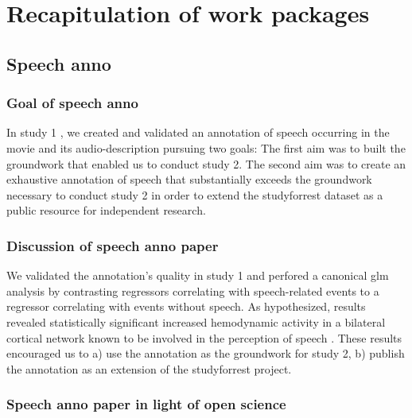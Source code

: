 \section{Recapitulation of work packages}



\subsection{Speech anno}


\subsubsection{Goal of speech anno}

In study 1 \citep{haeusler2021speechanno}, we created and validated an
annotation of speech occurring in the movie and its audio-description pursuing
two goals:
The first aim was to built the groundwork that enabled us to conduct study 2.
The second aim was to create an exhaustive annotation of speech that
substantially exceeds the groundwork necessary to conduct study 2 in order to
extend the studyforrest dataset as a public resource for independent research.


\subsubsection{Discussion of speech anno paper}

We validated the annotation's quality in study 1 and perfored a canonical
\ac{glm} analysis by contrasting regressors correlating with speech-related
events to a regressor correlating with events without speech.
As hypothesized, results revealed statistically significant increased
hemodynamic activity in a bilateral cortical network known to be involved in the
perception of speech \citep[e.g.,][]{friederici2011brain, wilson2008beyond}.
These results encouraged us to a) use the annotation as the groundwork for study
2, b) publish the annotation as an extension of the studyforrest project.


\subsubsection{Speech anno paper in light of open science}

